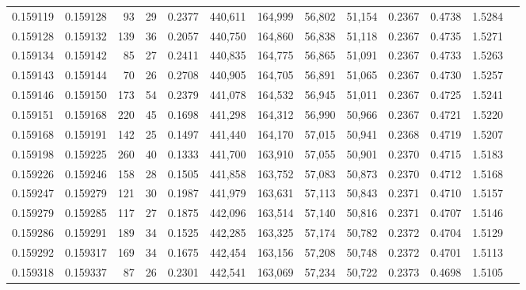 \begin{tabular}{rrrrrrrrrrrrr}
0.159119 & 0.159128 &    93 &  29 &                                     0.2377 & 440,611 & 164,999 &  56,802 &  51,154 & 0.2367 & 0.4738 & 1.5284 \\
0.159128 & 0.159132 &   139 &  36 &                                     0.2057 & 440,750 & 164,860 &  56,838 &  51,118 & 0.2367 & 0.4735 & 1.5271 \\
0.159134 & 0.159142 &    85 &  27 &                                     0.2411 & 440,835 & 164,775 &  56,865 &  51,091 & 0.2367 & 0.4733 & 1.5263 \\
0.159143 & 0.159144 &    70 &  26 &                                     0.2708 & 440,905 & 164,705 &  56,891 &  51,065 & 0.2367 & 0.4730 & 1.5257 \\
0.159146 & 0.159150 &   173 &  54 &                                     0.2379 & 441,078 & 164,532 &  56,945 &  51,011 & 0.2367 & 0.4725 & 1.5241 \\
0.159151 & 0.159168 &   220 &  45 &                                     0.1698 & 441,298 & 164,312 &  56,990 &  50,966 & 0.2367 & 0.4721 & 1.5220 \\
0.159168 & 0.159191 &   142 &  25 &                                     0.1497 & 441,440 & 164,170 &  57,015 &  50,941 & 0.2368 & 0.4719 & 1.5207 \\
0.159198 & 0.159225 &   260 &  40 &                                     0.1333 & 441,700 & 163,910 &  57,055 &  50,901 & 0.2370 & 0.4715 & 1.5183 \\
0.159226 & 0.159246 &   158 &  28 &                                     0.1505 & 441,858 & 163,752 &  57,083 &  50,873 & 0.2370 & 0.4712 & 1.5168 \\
0.159247 & 0.159279 &   121 &  30 &                                     0.1987 & 441,979 & 163,631 &  57,113 &  50,843 & 0.2371 & 0.4710 & 1.5157 \\
0.159279 & 0.159285 &   117 &  27 &                                     0.1875 & 442,096 & 163,514 &  57,140 &  50,816 & 0.2371 & 0.4707 & 1.5146 \\
0.159286 & 0.159291 &   189 &  34 &                                     0.1525 & 442,285 & 163,325 &  57,174 &  50,782 & 0.2372 & 0.4704 & 1.5129 \\
0.159292 & 0.159317 &   169 &  34 &                                     0.1675 & 442,454 & 163,156 &  57,208 &  50,748 & 0.2372 & 0.4701 & 1.5113 \\
0.159318 & 0.159337 &    87 &  26 &                                     0.2301 & 442,541 & 163,069 &  57,234 &  50,722 & 0.2373 & 0.4698 & 1.5105 \\

\end{tabular}
